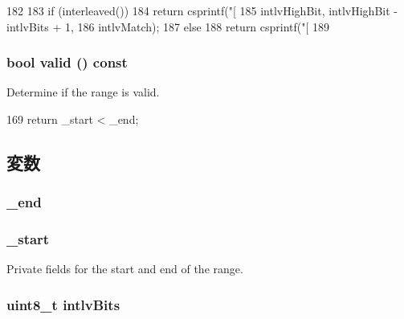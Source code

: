 \begin{DoxyCode}
182     {
183         if (interleaved())
184             return csprintf("[%
185                             intlvHighBit, intlvHighBit - intlvBits + 1,
186                             intlvMatch);
187         else
188             return csprintf("[%
189     }
\end{DoxyCode}
\hypertarget{classAddrRange_a8d985300b138b6c5556ab17ed4df3b38}{
\subsubsection[{valid}]{\setlength{\rightskip}{0pt plus 5cm}bool valid () const}}
\label{classAddrRange_a8d985300b138b6c5556ab17ed4df3b38}
Determine if the range is valid. 


\begin{DoxyCode}
169 { return _start < _end; }
\end{DoxyCode}


\subsection{変数}
\hypertarget{classAddrRange_a945d5a5b811e52aaf2aa2ca0b1aff5c5}{
\subsubsection[{\_\-end}]{ {\bf \_\-end}}}
\label{classAddrRange_a945d5a5b811e52aaf2aa2ca0b1aff5c5}
\hypertarget{classAddrRange_a8ae30d144fb49dec55c70ef1274df68a}{
\subsubsection[{\_\-start}]{ {\bf \_\-start}}}
\label{classAddrRange_a8ae30d144fb49dec55c70ef1274df68a}


Private fields for the start and end of the range. \hypertarget{classAddrRange_a02537b213a36c9f9d57d8c79a0dfb198}{
\subsubsection[{intlvBits}]{\setlength{\rightskip}{0pt plus 5cm}uint8\_\-t {\bf intlvBits}}}
\label{classAddrRange_a02537b213a36c9f9d57d8c79a0dfb198}


